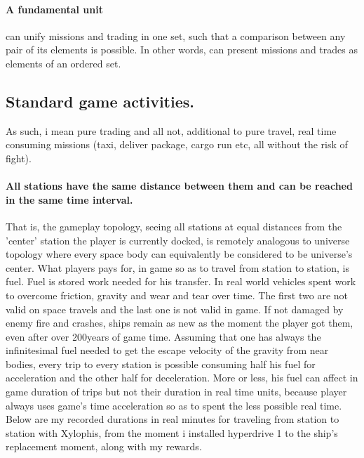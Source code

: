 \documentclass[]{article}
\begin{document}
\paragraph{A fundamental unit} can unify missions and trading in one set, such that a comparison between any pair of its elements is possible. In other words, can present missions and trades as elements of an ordered set.


\subsection{Standard game activities.} As such, i mean pure trading and all not, additional to pure travel,  real time consuming missions (taxi, deliver package, cargo run etc, all without the risk of fight). 
\paragraph{All stations have the same distance between them and can be reached in the same time interval.} That is, the gameplay topology, seeing all stations at equal distances from the 'center' station the player is currently docked, is remotely analogous to universe topology where every space body can equivalently be considered to be universe's center. What players pays for, in game so as to travel from station to station, is fuel. Fuel is stored work needed for his transfer. In real world vehicles spent work to overcome friction, gravity and wear and tear over time. The first two are not valid on space travels and the last one is not valid in game. If not damaged by enemy fire and crashes, ships remain as new as the moment the player got them, even after over 200years of game time. Assuming that one has always the infinitesimal fuel needed to get the escape velocity of the gravity from near bodies, every trip to every station is possible consuming half his fuel for acceleration and the other half for deceleration. More or less, his fuel can affect in game duration of trips but not their duration in real time units, because player always uses game's time acceleration so as to spent the less possible real time. Below are my recorded durations in real minutes for traveling from station to station with Xylophis, from the moment i installed hyperdrive 1 to the  ship's replacement moment, along with my rewards.
\end{document}
